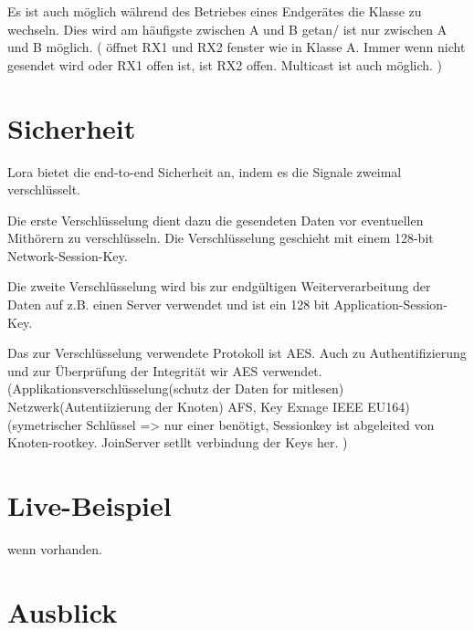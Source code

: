 \documentclass[a4paper,12pt]{article}
\begin{document}
            Es ist auch möglich während des Betriebes eines Endgerätes die Klasse zu wechseln. Dies wird am häufigste zwischen A und B getan/ ist nur zwischen A und B möglich.
            \cite{LoRaSpec}(
                öffnet RX1 und RX2 fenster wie in Klasse A. Immer wenn  nicht gesendet wird oder RX1 offen ist, ist RX2 offen. Multicast ist auch möglich.
            )
    \section{Sicherheit} \label{sec:Sicherheit}
        Lora bietet die end-to-end Sicherheit an, indem es die Signale zweimal verschlüsselt.

        Die erste Verschlüsselung dient dazu die gesendeten Daten vor eventuellen Mithörern zu verschlüsseln. Die Verschlüsselung geschieht mit einem 128-bit Network-Session-Key.

        Die zweite Verschlüsselung wird bis zur endgültigen Weiterverarbeitung der Daten auf z.B. einen Server verwendet und ist ein 128 bit Application-Session-Key.

        Das zur Verschlüsselung verwendete Protokoll ist AES. Auch zu Authentifizierung und zur Überprüfung der Integrität wir AES verwendet.
        \cite{LoRaSecur}
            \cite{WhatIsLoRa}(Applikationsverschlüsselung(schutz der Daten for mitlesen) Netzwerk(Autentiizierung der Knoten) AFS, Key Exnage IEEE EU164)
            \cite{LoRaSpec}(symetrischer Schlüssel => nur einer benötigt, Sessionkey ist abgeleited von Knoten-rootkey. JoinServer setllt verbindung der Keys her.
            )
    \section{Live-Beispiel}
        wenn vorhanden.

    \section{Ausblick}
        \newpage
    
    
\end{document}
